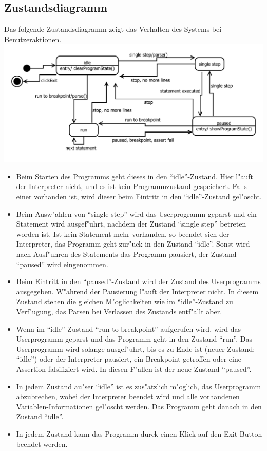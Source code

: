 \documentclass[10pt,a4paper,titlepage]{article}
\begin{document}
\subsection{Zustandsdiagramm}
Das folgende Zustandsdiagramm zeigt das Verhalten des Systems bei Benutzeraktionen. \\
\includegraphics[scale=0.9]{images/Zustand.pdf}\\
\begin{itemize}
\item Beim Starten des Programms geht dieses in den "`idle"'-Zustand. Hier l"auft der Interpreter nicht, und es ist kein Programmzustand gespeichert. Falls einer vorhanden ist, wird dieser beim Eintritt in den "`idle"'-Zustand gel"oscht.
\item Beim Ausw"ahlen von "`single step"' wird das Userprogramm geparst und ein Statement wird ausgef"uhrt, nachdem der Zustand "`single step"' betreten worden ist. Ist kein Statement mehr vorhanden, so beendet sich der Interpreter, das Programm geht zur"uck in den Zustand "`idle"'. Sonst wird nach Ausf"uhren des Statements das Programm pausiert, der Zustand "`paused"' wird eingenommen.
\item Beim Eintritt in den "`paused"'-Zustand wird der Zustand des Userprogramms ausgegeben. W"ahrend der Pausierung l"auft der Interpreter nicht. In diesem Zustand stehen die gleichen M"oglichkeiten wie im "`idle"'-Zustand zu Verf"ugung, das Parsen bei Verlassen des Zustands entf"allt aber.
\item Wenn im "`idle"'-Zustand "`run to breakpoint"' aufgerufen wird, wird das Userprogramm geparst und das Programm geht in den Zustand "`run"'. Das Userprogramm wird solange ausgef"uhrt, bis es zu Ende ist (neuer Zustand: "`idle"') oder der Interpreter pausiert, ein Breakpoint getroffen oder eine Assertion falsifiziert wird. In diesen F"allen ist der neue Zustand "`paused"'.
\item In jedem Zustand au"ser "`idle"' ist es zus"atzlich m"oglich, das Userprogramm abzubrechen, wobei der Interpreter beendet wird und alle vorhandenen Variablen-Informationen gel"oscht werden. Das Programm geht danach in den Zustand "`idle"'.
\item In jedem Zustand kann das Programm durck einen Klick auf den Exit-Button beendet werden.
\end{itemize}
\newpage
\end{document}
